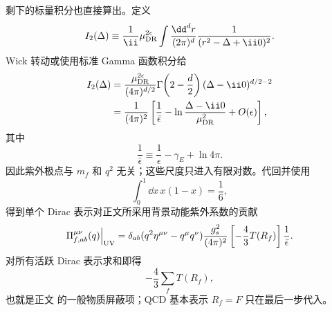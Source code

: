 \begin{derivation}[夸克圈对规范耦合的修正]
剩下的标量积分也直接算出。定义
\begin{equation*}
 I_2(\Delta)
 \equiv\frac1{\ii}\mu_{\rm DR}^{2\epsilon}
 \int\frac{\dd^d r}{(2\pi)^d}
 \frac1{(r^2-\Delta+\ii0)^2}.
\end{equation*}
Wick 转动或使用标准 Gamma 函数积分给
\begin{align*}
 I_2(\Delta)
 &=\frac{\mu_{\rm DR}^{2\epsilon}}
 {(4\pi)^{d/2}}
 \Gamma\!\left(2-\frac d2\right)
 (\Delta-\ii0)^{d/2-2}\\
 &=\frac1{(4\pi)^2}
 \left[
 \frac1{\bar\epsilon}
 -\ln\frac{\Delta-\ii0}{\mu_{\rm DR}^2}
 +O(\epsilon)
 \right],
\end{align*}
其中
\begin{equation*}
 \frac1{\bar\epsilon}
 \equiv\frac1\epsilon-\gamma_E+\ln4\pi.
\end{equation*}
因此紫外极点与 $m_f$ 和 $q^2$ 无关；这些尺度只进入有限对数。代回并使用
\begin{equation*}
 \int_0^1\dd x\,x(1-x)=\frac16,
\end{equation*}
得到单个 Dirac 表示对正文所采用背景动能紫外系数的贡献
\begin{equation*}
 \Pi_{f,ab}^{\mu\nu}(q)\Big|_{\rm UV}
 =\delta_{ab}(q^2\eta^{\mu\nu}-q^\mu q^\nu)
 \frac{g_s^2}{(4\pi)^2}
 \left[-\frac43T(R_f)\right]
 \frac1{\bar\epsilon}.
\end{equation*}
对所有活跃 Dirac 表示求和即得
\begin{equation*}
 -\frac43\sum_fT(R_f),
\end{equation*}
也就是正文 的一般物质屏蔽项；QCD 基本表示 $R_f=F$ 只在最后一步代入。
\end{derivation}

